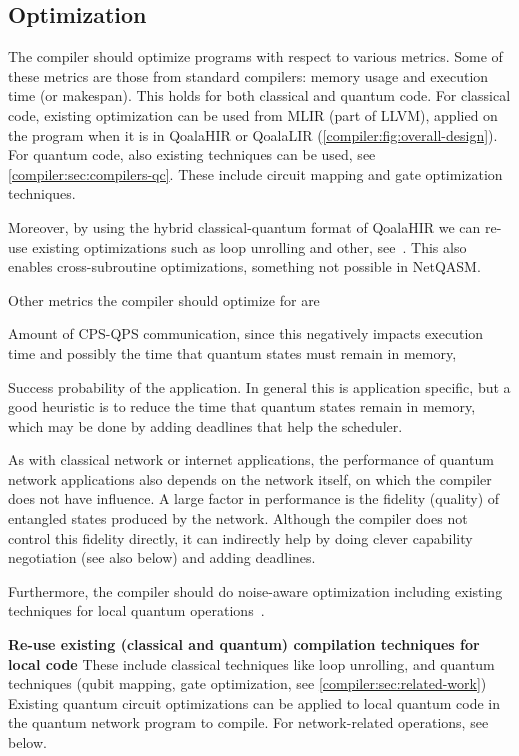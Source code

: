 \subsection{Optimization}
The compiler should optimize programs with respect to various metrics.
Some of these metrics are those from standard compilers: memory usage and execution time (or makespan).
This holds for both classical and quantum code.
For classical code, existing optimization can be used from MLIR (part of LLVM), applied on the program when it is in QoalaHIR or QoalaLIR (\cref{compiler:fig:overall-design}).
For quantum code, also existing techniques can be used, see \cref{compiler:sec:compilers-qc}.
These include circuit mapping and gate optimization techniques.

Moreover, by using the hybrid classical-quantum format of QoalaHIR we can re-use existing optimizations such as loop unrolling and other, see~\cite{mccaskey_mlir_2021, ittah_enabling_2022, nguyen_retargetable_2022, peduri_qssa_2022}.
This also enables cross-subroutine optimizations, something not possible in NetQASM.

Other metrics the compiler should optimize for are
\begin{inlinelist}
\item Amount of CPS-QPS communication, since this negatively impacts execution time and possibly the time that quantum states must remain in memory,
\item Success probability of the application. In general this is application specific, but a good heuristic is to reduce the time that quantum states remain in memory, which may be done by adding deadlines that help the scheduler.
\end{inlinelist}

As with classical network or internet applications, the performance of quantum network applications also depends on the network itself, on which the compiler does not have influence.
A large factor in performance is the fidelity (quality) of entangled states produced by the network.
Although the compiler does not control this fidelity directly, it can indirectly help by doing clever capability negotiation (see also below) and adding deadlines.

Furthermore, the compiler should do noise-aware optimization including existing techniques for local quantum operations~\cite{smith_error_2021, murali_noise-adaptive_2019}.


\textbf{Re-use existing (classical and quantum) compilation techniques for local code}
These include classical techniques like loop unrolling, and quantum techniques (qubit mapping, gate optimization, see \cref{compiler:sec:related-work})
Existing quantum circuit optimizations can be applied to local quantum code in the quantum network program to compile.
For network-related operations, see below.

